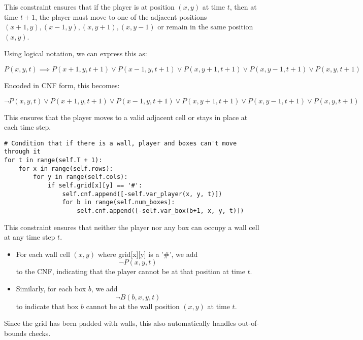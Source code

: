 \documentclass[12pt,a4paper]{article}
\begin{document}
This constraint ensures that if the player is at position \((x,y)\) at time \(t\), then at time \(t+1\), the player must move to one of the adjacent positions \((x+1,y), (x-1,y), (x,y+1), (x,y-1)\) or remain in the same position \((x,y)\).

Using logical notation, we can express this as:

\[
P(x,y,t) \implies P(x+1,y,t+1) \lor P(x-1,y,t+1) \lor P(x,y+1,t+1) \lor P(x,y-1,t+1) \lor P(x,y,t+1)
\]

Encoded in CNF form, this becomes:

\[
\neg P(x,y,t) \lor P(x+1,y,t+1) \lor P(x-1,y,t+1) \lor P(x,y+1,t+1) \lor P(x,y-1,t+1) \lor P(x,y,t+1)
\]

\noindent This ensures that the player moves to a valid adjacent cell or stays in place at each time step.
\newpage



\begin{lstlisting}
# Condition that if there is a wall, player and boxes can't move through it
for t in range(self.T + 1):
    for x in range(self.rows):
        for y in range(self.cols):
            if self.grid[x][y] == '#':
                self.cnf.append([-self.var_player(x, y, t)])
                for b in range(self.num_boxes):
                    self.cnf.append([-self.var_box(b+1, x, y, t)])
\end{lstlisting}

This constraint ensures that neither the player nor any box can occupy a wall cell at any time step \(t\).  

\begin{itemize}
    \item For each wall cell \((x,y)\) where grid[x][y] is a '\#', we add 
    \[
    \neg P(x,y,t)
    \] 
    to the CNF, indicating that the player cannot be at that position at time \(t\).  

    \item Similarly, for each box \(b\), we add 
    \[
    \neg B(b,x,y,t)
    \] 
    to indicate that box \(b\) cannot be at the wall position \((x,y)\) at time \(t\).  
\end{itemize}

Since the grid has been padded with walls, this also automatically handles out-of-bounds checks.
\newpage
\end{document}
